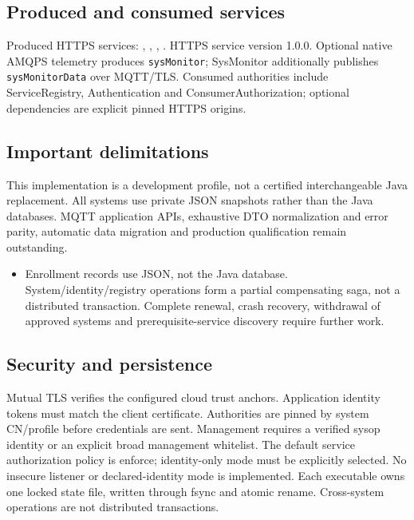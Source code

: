 \documentclass[a4paper]{arrowhead}
\begin{document}
\subsection{Produced and consumed services}
Produced HTTPS services: , \allowbreak {}, \allowbreak {}, \allowbreak {}.
HTTPS service version 1.0.0. Optional native AMQPS telemetry produces \texttt{sysMonitor}; SysMonitor additionally publishes \texttt{sysMonitorData} over MQTT/TLS. Consumed authorities include ServiceRegistry, Authentication and ConsumerAuthorization; optional dependencies are explicit pinned HTTPS origins.
\subsection{Important delimitations}
This implementation is a development profile, not a certified interchangeable Java replacement. All systems use private JSON snapshots rather than the Java databases. MQTT application APIs, exhaustive DTO normalization and error parity, automatic data migration and production qualification remain outstanding.
\begin{itemize}
\item Enrollment records use JSON, not the Java database. System/identity/registry operations form a partial compensating saga, not a distributed transaction. Complete renewal, crash recovery, withdrawal of approved systems and prerequisite-service discovery require further work.
\end{itemize}
\subsection{Security and persistence}
Mutual TLS verifies the configured cloud trust anchors. Application identity tokens must match the client certificate. Authorities are pinned by system CN/profile before credentials are sent. Management requires a verified sysop identity or an explicit broad management whitelist. The default service authorization policy is enforce; identity-only mode must be explicitly selected. No insecure listener or declared-identity mode is implemented. Each executable owns one locked state file, written through fsync and atomic rename. Cross-system operations are not distributed transactions.
\clearpage
\end{document}
